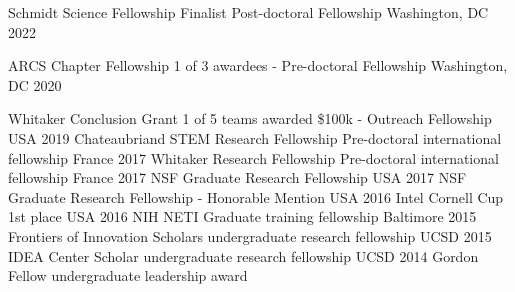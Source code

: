 
\begin{cvhonors}
  \cvhonor
    {Schmidt Science Fellowship Finalist} %
    {Post-doctoral Fellowship} %
    {Washington, DC} %
    {2022} %
    
  \cvhonor
    {ARCS Chapter Fellowship} %
    {1 of 3 awardees - Pre-doctoral Fellowship} %
    {Washington, DC} %
    {2020} %
    
  \cvhonor
    {Whitaker Conclusion Grant}
    {1 of 5 teams awarded \$100k - Outreach Fellowship} %
    {USA} %
    {2019} %
  \cvhonor
    {Chateaubriand STEM Research Fellowship} %
    {Pre-doctoral international fellowship} %
    {France} %
    {2017} %
  \cvhonor
    {Whitaker Research Fellowship} %
    {Pre-doctoral international fellowship} %
    {France} %
    {2017} %
  \cvhonor
    {NSF} %
    {Graduate Research Fellowship} %
    {USA} %
    {2017} %
  \cvhonor
    {NSF} %
    {Graduate Research Fellowship - Honorable Mention} %
    {USA} %
    {2016} %
  \cvhonor
    {Intel Cornell Cup} %
    {1st place} %
    {USA} %
    {2016} %
  \cvhonor
    {NIH NETI} %
    {Graduate training fellowship} %
    {Baltimore} %
    {2015} %
  \cvhonor
    {Frontiers of Innovation Scholars} %
    {undergraduate research fellowship} %
    {UCSD} %
    {2015} %
  \cvhonor
    {IDEA Center Scholar} %
    {undergraduate research fellowship} %
    {UCSD} %
    {2014} %
  \cvhonor
    {Gordon Fellow} %
    {undergraduate leadership award} %

\end{cvhonors}
